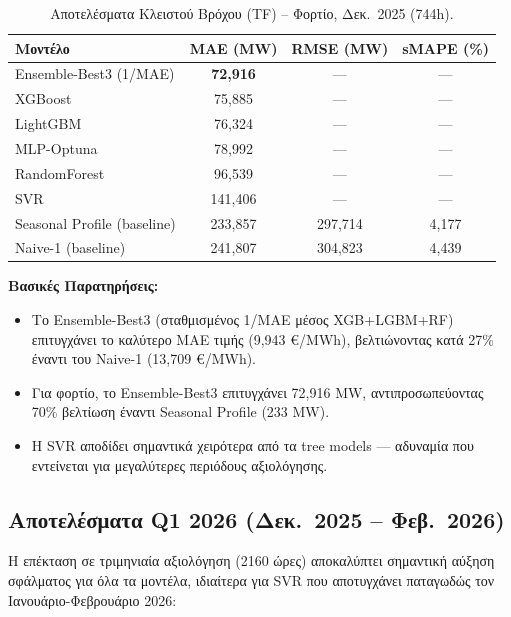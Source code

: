 \begin{table}[H]
\centering
\caption{Αποτελέσματα Κλειστού Βρόχου (TF) -- Φορτίο, Δεκ.\ 2025 (744h).}
\label{tab:cl_load_1m}
\begin{tabular}{lccc}
\toprule
\textbf{Μοντέλο} & \textbf{MAE (MW)} & \textbf{RMSE (MW)} & \textbf{sMAPE (\%)} \\
\midrule
Ensemble-Best3 (1/MAE) & \textbf{72,916} & --- & --- \\
XGBoost & 75,885 & --- & --- \\
LightGBM & 76,324 & --- & --- \\
MLP-Optuna & 78,992 & --- & --- \\
RandomForest & 96,539 & --- & --- \\
SVR & 141,406 & --- & --- \\
\midrule
Seasonal Profile (baseline) & 233,857 & 297,714 & 4,177 \\
Naive-1 (baseline) & 241,807 & 304,823 & 4,439 \\
\bottomrule
\end{tabular}
\end{table}

\noindent\textbf{Βασικές Παρατηρήσεις:}
\begin{itemize}
    \item Το Ensemble-Best3 (σταθμισμένος 1/MAE μέσος XGB+LGBM+RF) επιτυγχάνει το καλύτερο MAE
    τιμής (9,943 €/MWh), βελτιώνοντας κατά 27\% έναντι του Naive-1 (13,709 €/MWh).
    \item Για φορτίο, το Ensemble-Best3 επιτυγχάνει 72,916 MW, αντιπροσωπεύοντας 70\% βελτίωση
    έναντι Seasonal Profile (233 MW).
    \item Η SVR αποδίδει σημαντικά χειρότερα από τα tree models --- αδυναμία που εντείνεται για
    μεγαλύτερες περιόδους αξιολόγησης.
\end{itemize}

\subsection{Αποτελέσματα Q1 2026 (Δεκ.\ 2025 -- Φεβ.\ 2026)}

Η επέκταση σε τριμηνιαία αξιολόγηση (2160 ώρες) αποκαλύπτει σημαντική αύξηση σφάλματος για
όλα τα μοντέλα, ιδιαίτερα για SVR που αποτυγχάνει παταγωδώς τον Ιανουάριο-Φεβρουάριο 2026:

